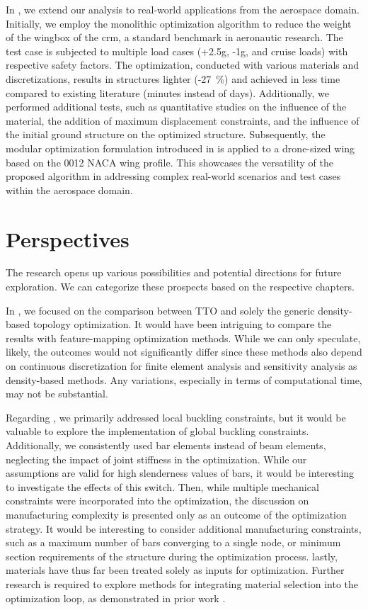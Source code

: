 In , we extend our analysis to real-world applications from the aerospace domain. Initially, we employ the monolithic optimization algorithm to reduce the weight of the wingbox of the \gls{crm}, a standard benchmark in aeronautic research. The test case is subjected to multiple load cases (+2.5g, -1g, and cruise loads) with respective safety factors. The optimization, conducted with various materials and discretizations, results in structures lighter (-\qty{27}{\%}) and achieved in less time compared to existing literature (minutes instead of days). Additionally, we performed additional tests, such as quantitative studies on the influence of the material, the addition of maximum displacement constraints, and the influence of the initial ground structure on the optimized structure.  Subsequently, the modular optimization formulation introduced in  is applied to a drone-sized wing based on the 0012 NACA wing profile. This showcases the versatility of the proposed algorithm in addressing complex real-world scenarios and test cases within the aerospace domain.

\section*{Perspectives}
The research opens up various possibilities and potential directions for future exploration. We can categorize these prospects based on the respective chapters.

In , we focused on the comparison between TTO and solely the generic density-based topology optimization. It would have been intriguing to compare the results with feature-mapping optimization methods. While we can only speculate, likely, the outcomes would not significantly differ since these methods also depend on continuous discretization for finite element analysis and sensitivity analysis as density-based methods. Any variations, especially in terms of computational time, may not be substantial.

Regarding , we primarily addressed local buckling constraints, but it would be valuable to explore the implementation of global buckling constraints. Additionally, we consistently used bar elements instead of beam elements, neglecting the impact of joint stiffness in the optimization. While our assumptions are valid for high slenderness values of bars, it would be interesting to investigate the effects of this switch. Then, while multiple mechanical constraints were incorporated into the optimization, the discussion on manufacturing complexity is presented only as an outcome of the optimization strategy. It would be interesting to consider additional manufacturing constraints, such as a maximum number of bars converging to a single node, or minimum section requirements of the structure during the optimization process. lastly, materials have thus far been treated solely as inputs for optimization. Further research is required to explore methods for integrating material selection into the optimization loop, as demonstrated in prior work .

